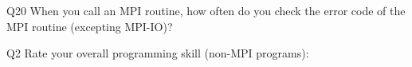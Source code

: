 \begin{description}%
\item{Q20} When you call an MPI routine, how often do you check the error code of the MPI routine  (excepting MPI-IO)?%
\item{Q2} Rate your overall programming skill (non-MPI programs):%
\end{description}%
